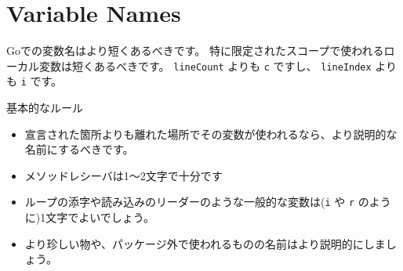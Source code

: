 \section{Variable Names}

Goでの変数名はより短くあるべきです。 特に限定されたスコープで使われるローカル変数は短くあるべきです。 \texttt{lineCount} よりも \texttt{c} ですし、 \texttt{lineIndex} よりも \texttt{i} です。

基本的なルール

\begin{itemize}
  \item 宣言された箇所よりも離れた場所でその変数が使われるなら、より説明的な名前にするべきです。
  \item メソッドレシーバは1〜2文字で十分です
  \item ループの添字や読み込みのリーダーのような一般的な変数は(\texttt{i} や \texttt{r} のように)1文字でよいでしょう。
  \item より珍しい物や、パッケージ外で使われるものの名前はより説明的にしましょう。
\end{itemize}
